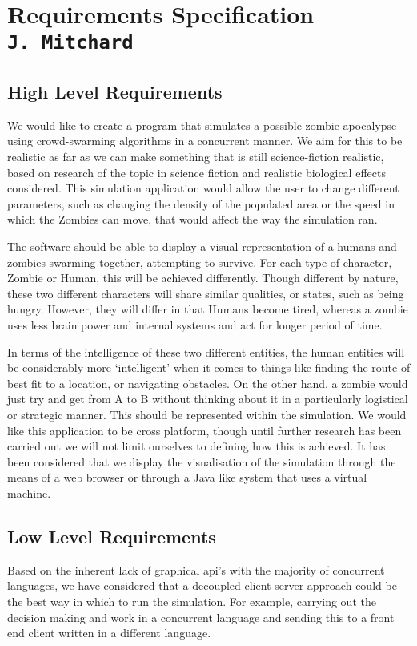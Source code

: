 \pagestyle{empty}
\section{Requirements Specification\\{\small\tt J.~Mitchard}}
\subsection{High Level Requirements}
We would like to create a program that simulates a possible zombie apocalypse using crowd-swarming algorithms in a concurrent manner. We aim for this to be realistic as far as we can make something that is still science-fiction realistic, based on research of the topic in science fiction and realistic biological effects considered. This simulation application would allow the user to change different parameters, such as changing the density of the populated area or the speed in which the Zombies can move, that would affect the way the simulation ran. 

The software should be able to display a visual representation of a humans and zombies swarming together, attempting to survive. For each type of character, Zombie or Human, this will be achieved differently. Though different by nature, these two different characters will share similar qualities, or states, such as being hungry. However, they will differ in that Humans become tired, whereas a zombie uses less brain power and internal systems and act for longer period of time.

In terms of the intelligence of these two different entities, the human entities will be considerably more ‘intelligent’ when it comes to things like finding the route of best fit to a location, or navigating obstacles. On the other hand, a zombie would just try and get from A to B without thinking about it in a particularly logistical or strategic manner. This should be represented within the simulation.
We would like this application to be cross platform, though until further research has been carried out we will not limit ourselves to defining how this is achieved. It has been considered that we display the visualisation of the simulation through the means of a web browser or through a Java like system that uses a virtual machine.
\subsection{Low Level Requirements}
Based on the inherent lack of graphical api’s with the majority of concurrent languages, we have considered that a decoupled client-server approach could be the best way in which to run the simulation. For example, carrying out the decision making and work in a concurrent language and sending this to a front end client written in a different language.

